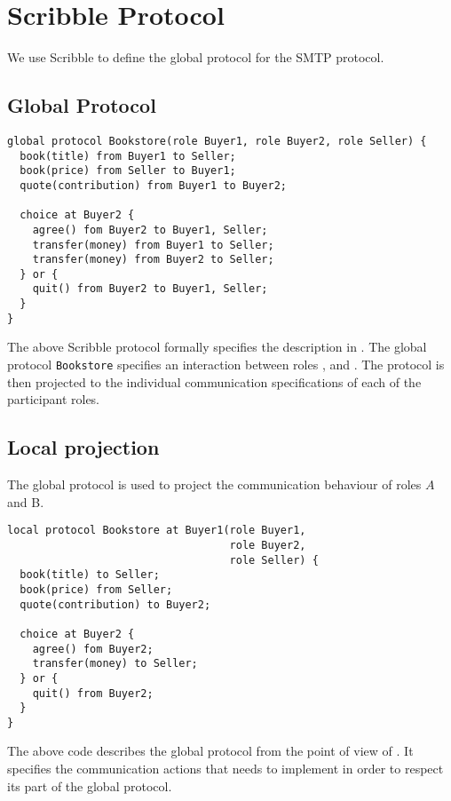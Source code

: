 \section{Scribble Protocol}

We use Scribble to define the global
protocol for the SMTP protocol.

\subsection{Global Protocol}


\begin{lstlisting}[caption={Global Protocol for Bookstore}]
global protocol Bookstore(role Buyer1, role Buyer2, role Seller) {
  book(title) from Buyer1 to Seller;
  book(price) from Seller to Buyer1;
  quote(contribution) from Buyer1 to Buyer2;

  choice at Buyer2 {
    agree() fom Buyer2 to Buyer1, Seller;
    transfer(money) from Buyer1 to Seller;
    transfer(money) from Buyer2 to Seller;
  } or {
    quit() from Buyer2 to Buyer1, Seller;
  }
}
\end{lstlisting}

The above Scribble protocol formally specifies
the description in .
The global protocol \lstinline|Bookstore| specifies
an interaction between roles \BuyerOne, \BuyerTwo and
\Seller. The protocol is then projected to the
individual communication specifications of each 
of the participant roles.



\subsection{Local projection}
The global protocol is used to project the communication
behaviour of roles $A$ and B.


\begin{lstlisting}[caption={Local Protocol for Role \BuyerOne}]
local protocol Bookstore at Buyer1(role Buyer1,
                                   role Buyer2,
                                   role Seller) {
  book(title) to Seller;
  book(price) from Seller;
  quote(contribution) to Buyer2;

  choice at Buyer2 {
    agree() fom Buyer2;
    transfer(money) to Seller;
  } or {
    quit() from Buyer2;
  }
}
\end{lstlisting}

The above code describes the global protocol from the
point of view of \BuyerOne. It specifies the
communication actions that \BuyerOne needs to implement
in order to respect its part of the global protocol. 


